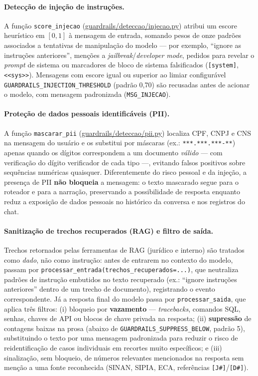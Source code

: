 \documentclass[11pt,a4paper]{article}
\begin{document}
\paragraph{Detecção de injeção de instruções.} A função \texttt{score\_injecao} (\url{guardrails/deteccao/injecao.py}) atribui um escore heurístico em $[0, 1]$ à mensagem de entrada, somando pesos de onze padrões associados a tentativas de manipulação do modelo — por exemplo, ``ignore as instruções anteriores'', menções a \textit{jailbreak}/\textit{developer mode}, pedidos para revelar o \textit{prompt} de sistema ou marcadores de bloco de sistema falsificados (\texttt{[system]}, \texttt{<<sys>>}). Mensagens com escore igual ou superior ao limiar configurável \texttt{GUARDRAILS\_INJECTION\_THRESHOLD} (padrão 0,70) são recusadas antes de acionar o modelo, com mensagem padronizada (\texttt{MSG\_INJECAO}).

\paragraph{Proteção de dados pessoais identificáveis (PII).} A função \texttt{mascarar\_pii} (\url{guardrails/deteccao/pii.py}) localiza CPF, CNPJ e CNS na mensagem do usuário e os substitui por máscaras (ex.: \texttt{***.***.***-**}) apenas quando os dígitos correspondem a um documento \emph{válido} — com verificação do dígito verificador de cada tipo —, evitando falsos positivos sobre sequências numéricas quaisquer. Diferentemente do risco pessoal e da injeção, a presença de PII \textbf{não bloqueia} a mensagem: o texto mascarado segue para o roteador e para a narração, preservando a possibilidade de resposta enquanto reduz a exposição de dados pessoais no histórico da conversa e nos registros do chat.

\paragraph{Sanitização de trechos recuperados (RAG) e filtro de saída.} Trechos retornados pelas ferramentas de RAG (jurídico e interno) são tratados como \emph{dado}, não como instrução: antes de entrarem no contexto do modelo, passam por \texttt{processar\_entrada(trechos\_recuperados=...)}, que neutraliza padrões de instrução embutidos no texto recuperado (ex.: ``ignore instruções anteriores'' dentro de um trecho de documento), registrando o evento correspondente. Já a resposta final do modelo passa por \texttt{processar\_saida}, que aplica três filtros: (i) bloqueio por \textbf{vazamento} — \textit{tracebacks}, comandos SQL, senhas, chaves de API ou blocos de chave privada na resposta; (ii) \textbf{supressão} de contagens baixas na prosa (abaixo de \texttt{GUARDRAILS\_SUPPRESS\_BELOW}, padrão 5), substituindo o texto por uma mensagem padronizada para reduzir o risco de reidentificação de casos individuais em recortes muito específicos; e (iii) sinalização, sem bloqueio, de números relevantes mencionados na resposta sem menção a uma fonte reconhecida (SINAN, SIPIA, ECA, referências \texttt{[J\#]}/\texttt{[D\#]}).
\end{document}
